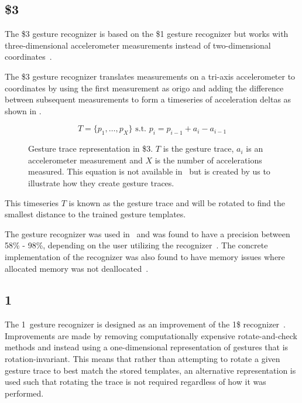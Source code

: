 
\subsection{\$3}

The \$3 gesture recognizer is based on the \$1 gesture recognizer but works with three-dimensional accelerometer measurements instead of two-dimensional coordinates~\cite{threedollar}.

The \$3 gesture recognizer translates measurements on a tri-axis accelerometer to coordinates by using the first measurement as origo and adding the difference between subsequent measurements to form a timeseries of acceleration deltas as shown in .

\begin{figure}[h]
\[ T = \{p_1,\ldots,p_X\} \text{ s.t. } p_i= p_{i-1} + a_i - a_{i-1} \]
\caption{Gesture trace representation in \$3. $T$ is the gesture trace, $a_i$ is an accelerometer measurement and $X$ is the number of accelerations measured.
This equation is not available in~\cite{threedollar} but is created by us to illustrate how they create gesture traces.}
\label{eq:acceleration-timeseries}
\end{figure}

This timeseries $T$ is known as the gesture trace and will be rotated to find the smallest distance to the trained gesture templates.

The gesture recognizer was used in~\cite{prespecialisation} and was found to have a precision between 58\% - 98\%, depending on the user utilizing the recognizer~\cite[p. 344]{threedollar}. The concrete implementation of the recognizer was also found to have memory issues where allocated memory was not deallocated~\cite[p. 54]{prespecialisation}.

\subsection{1\textcent}

The 1\textcent~gesture recognizer is designed as an improvement of the 1\$ recognizer~\cite{wobbrock2007gestures}. Improvements are made by removing computationally expensive rotate-and-check methods and instead using a one-dimensional representation of gestures that is rotation-invariant.
This means that rather than attempting to rotate a given gesture trace to best match the stored templates, an alternative representation is used such that rotating the trace is not required regardless of how it was performed.

